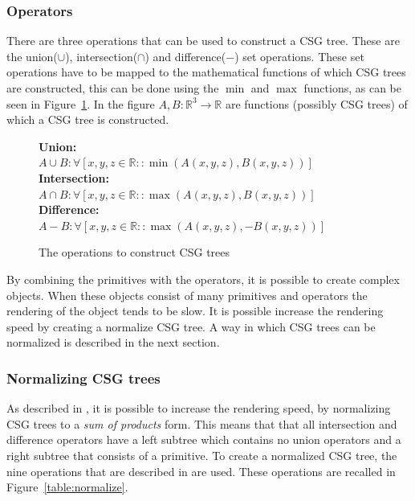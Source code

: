 \documentclass[a4paper,10pt,twocolumn]{article}
\begin{document}
\subsubsection{Operators}
    There are three operations that can be used to construct a CSG tree. These are the union($\cup$), intersection($\cap$) and difference($-$) set operations. These set operations have to be mapped to the mathematical functions of which CSG trees are constructed, this can be done using the $\min$ and $\max$ functions, as can be seen in Figure~\ref{figure:operations}. In the figure $A, B:\mathbb{R}^3 \rightarrow \mathbb{R}$ are functions (possibly CSG trees) of which a CSG tree is constructed.\\

    \begin{figure}[h]
        {\fontsize{8.7}{10}\selectfont
        \textbf{Union:}\\
        $A \cup B: \forall[x,y,z \in \mathbb{R} :: \min(A(x, y, z), B(x, y, z))]$ \\

        \textbf{Intersection:}\\
        $A \cap B: \forall[x,y,z \in \mathbb{R} :: \max(A(x, y, z), B(x, y, z))]$ \\

        \textbf{Difference:}\\
        $A - B: \forall[x,y,z \in \mathbb{R} :: \max(A(x, y, z), -B(x, y, z))]$
        }
        \caption{The operations to construct CSG trees}
        \label{figure:operations}
    \end{figure}

    By combining the primitives with the operators, it is possible to create complex objects. When these objects consist of many primitives and operators the rendering of the object tends to be slow. It is possible increase the rendering speed by creating a normalize CSG tree. A way in which CSG trees can be normalized is described in the next section.\\

\subsubsection{Normalizing CSG trees}
    As described in \cite{Wiegand96}, it is possible to increase the rendering speed, by normalizing CSG trees to a \textit{sum of products} form. This means that that all intersection and difference operators have a left subtree which contains no union operators and a right subtree that consists of a primitive. To create a normalized CSG tree, the nine operations that are described in \cite{Wiegand96} are used. These operations are recalled in Figure~\ref{table:normalize}.\\
\end{document}
